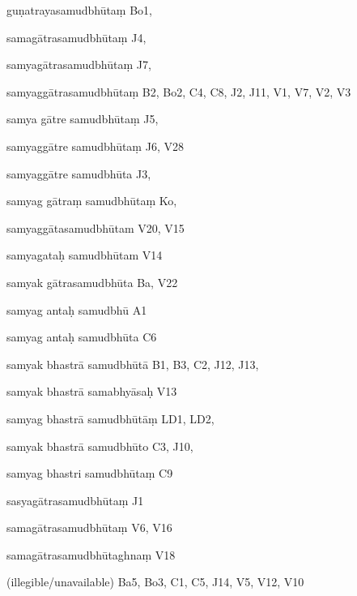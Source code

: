 \begin{ekdosis}
\begin{marma}[hp01_055]
\begin{marma}[hp02_009]
\begin{marma}[hp02_011]
\begin{marma}[hp02_67ab]
\begin{description}
        \end{description}
      \end{marma}


      \begin{marma}[hp02_68a]
      \item[guṇatrayasamudbhūtaṃ] Bo1,
      \item[samagātrasamudbhūtaṃ] J4,
      \item[samyagātrasamudbhūtaṃ] J7,
      \item[samyaggātrasamudbhūtaṃ] B2, Bo2, C4, C8, J2, J11, V1, V7, V2, V3
      \item[samya gātre samudbhūtaṃ] J5,
      \item[samyaggātre samudbhūtaṃ] J6, V28
      \item[samyaggātre samudbhūta] J3,
      \item[samyag gātraṃ samudbhūtaṃ] Ko,
      \item[samyaggātasamudbhūtam] V20, V15
      \item[samyagataḥ samudbhūtam] V14
      \item[samyak gātrasamudbhūta] Ba, V22
      \item[samyag antaḥ samudbhū] A1
      \item[samyag antaḥ samudbhūta] C6
      \item[samyak bhastrā samudbhūtā] B1, B3, C2, J12, J13,    
      \item[samyak bhastrā samabhyāsaḥ] V13
      \item[samyag bhastrā samudbhūtāṃ] LD1, LD2, 
      \item[samyak bhastrā samudbhūto] C3, J10, 
      \item[samyag bhastri samudbhūtaṃ] C9
      \item[sasyagātrasamudbhūtaṃ] J1
      \item[samagātrasamudbhūtaṃ] V6, V16
      \item[samagātrasamudbhūtaghnaṃ] V18
      \item[(illegible/unavailable)] Ba5, Bo3, C1, C5, J14, V5, V12, V10
        \begin{description}

        \end{description}
      \end{marma}



\end{marma}
\end{marma}
\end{marma}
\end{ekdosis}
